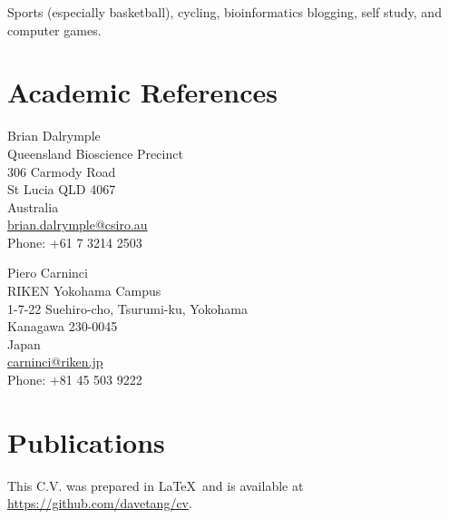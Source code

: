 \documentclass[a4paper, 10pt]{article}
\begin{document}
Sports (especially basketball), cycling, bioinformatics blogging, self study, and computer games.

\section*{Academic References}

\begin{minipage}[ht]{.50\textwidth}
Brian Dalrymple \\
Queensland Bioscience Precinct \\
306 Carmody Road \\
St Lucia QLD 4067 \\
Australia \\
\href{mailto:brian.dalrymple@csiro.au}{brian.dalrymple@csiro.au} \\
Phone: +61 7 3214 2503
\end{minipage}
\begin{minipage}[ht]{.50\textwidth}
Piero Carninci \\
RIKEN Yokohama Campus \\
1-7-22 Suehiro-cho, Tsurumi-ku, Yokohama \\
Kanagawa 230-0045 \\
Japan \\
\href{mailto:carninci@riken.jp}{carninci@riken.jp} \\
Phone: +81 45 503 9222
\end{minipage}

\section*{Publications}
\begingroup
   \renewcommand{\section}[2]{}%
   
   \nocite{*}
   
\endgroup

\vfill

\footnotesize
This C.V. was prepared in \LaTeX\ and is available at \href{https://github.com/davetang/cv}{https://github.com/davetang/cv}.
\end{document}
